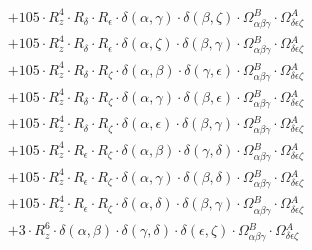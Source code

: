 \documentclass{article}
\begin{document}
\begin{equation}
\begin{array}{c}
 \\[0.2em] 		 + 105 \cdot R_{z}^{4} \cdot R_{\delta{}} \cdot R_{\epsilon{}} \cdot \delta{}\left(\alpha{}, \gamma{}\right) \cdot \delta{}\left(\beta{}, \zeta{}\right) \cdot \Omega{}^{B}_{\alpha{}\beta{}\gamma{}} \cdot \Omega{}^{A}_{\delta{}\epsilon{}\zeta{}} 
 \\[0.2em] 		 + 105 \cdot R_{z}^{4} \cdot R_{\delta{}} \cdot R_{\epsilon{}} \cdot \delta{}\left(\alpha{}, \zeta{}\right) \cdot \delta{}\left(\beta{}, \gamma{}\right) \cdot \Omega{}^{B}_{\alpha{}\beta{}\gamma{}} \cdot \Omega{}^{A}_{\delta{}\epsilon{}\zeta{}} 
 \\[0.2em] 		 + 105 \cdot R_{z}^{4} \cdot R_{\delta{}} \cdot R_{\zeta{}} \cdot \delta{}\left(\alpha{}, \beta{}\right) \cdot \delta{}\left(\gamma{}, \epsilon{}\right) \cdot \Omega{}^{B}_{\alpha{}\beta{}\gamma{}} \cdot \Omega{}^{A}_{\delta{}\epsilon{}\zeta{}} 
 \\[0.2em] 		 + 105 \cdot R_{z}^{4} \cdot R_{\delta{}} \cdot R_{\zeta{}} \cdot \delta{}\left(\alpha{}, \gamma{}\right) \cdot \delta{}\left(\beta{}, \epsilon{}\right) \cdot \Omega{}^{B}_{\alpha{}\beta{}\gamma{}} \cdot \Omega{}^{A}_{\delta{}\epsilon{}\zeta{}} 
 \\[0.2em] 		 + 105 \cdot R_{z}^{4} \cdot R_{\delta{}} \cdot R_{\zeta{}} \cdot \delta{}\left(\alpha{}, \epsilon{}\right) \cdot \delta{}\left(\beta{}, \gamma{}\right) \cdot \Omega{}^{B}_{\alpha{}\beta{}\gamma{}} \cdot \Omega{}^{A}_{\delta{}\epsilon{}\zeta{}} 
 \\[0.2em] 		 + 105 \cdot R_{z}^{4} \cdot R_{\epsilon{}} \cdot R_{\zeta{}} \cdot \delta{}\left(\alpha{}, \beta{}\right) \cdot \delta{}\left(\gamma{}, \delta{}\right) \cdot \Omega{}^{B}_{\alpha{}\beta{}\gamma{}} \cdot \Omega{}^{A}_{\delta{}\epsilon{}\zeta{}} 
 \\[0.2em] 		 + 105 \cdot R_{z}^{4} \cdot R_{\epsilon{}} \cdot R_{\zeta{}} \cdot \delta{}\left(\alpha{}, \gamma{}\right) \cdot \delta{}\left(\beta{}, \delta{}\right) \cdot \Omega{}^{B}_{\alpha{}\beta{}\gamma{}} \cdot \Omega{}^{A}_{\delta{}\epsilon{}\zeta{}} 
 \\[0.2em] 		 + 105 \cdot R_{z}^{4} \cdot R_{\epsilon{}} \cdot R_{\zeta{}} \cdot \delta{}\left(\alpha{}, \delta{}\right) \cdot \delta{}\left(\beta{}, \gamma{}\right) \cdot \Omega{}^{B}_{\alpha{}\beta{}\gamma{}} \cdot \Omega{}^{A}_{\delta{}\epsilon{}\zeta{}} 
 \\[0.2em] 		 + 3 \cdot R_{z}^{6} \cdot \delta{}\left(\alpha{}, \beta{}\right) \cdot \delta{}\left(\gamma{}, \delta{}\right) \cdot \delta{}\left(\epsilon{}, \zeta{}\right) \cdot \Omega{}^{B}_{\alpha{}\beta{}\gamma{}} \cdot \Omega{}^{A}_{\delta{}\epsilon{}\zeta{}} 

\end{array}
\end{equation}
\end{document}
